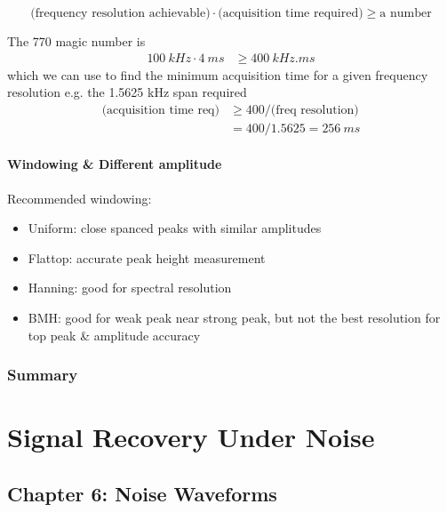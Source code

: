 \documentclass[../main.tex]{subfiles}
\begin{document}
\[\textrm{(frequency resolution achievable)} \cdot \textrm{(acquisition time required)} \geq  \textrm{a number}\]

The 770 magic number is
\begin{align*}
    \qty{100}{kHz} \cdot \qty{4}{ms} &\geq \qty{400}{kHz.ms}
\end{align*}
which we can use to find the minimum acquisition time for a given frequency resolution e.g. the 1.5625 kHz span required
\begin{align*}
    \textrm{(acquisition time req)} &\geq 400 / \textrm{(freq resolution)} \\
    &= 400 / 1.5625 = \qty{256}{ms}
\end{align*}

\paragraph*{Windowing \& Different amplitude}

Recommended windowing:
\begin{itemize}
    \item Uniform: close spanced peaks with similar amplitudes
    \item Flattop: accurate peak height measurement
    \item Hanning: good for spectral resolution
    \item BMH: good for weak peak near strong peak, but not the best resolution for top peak \& amplitude accuracy
\end{itemize}

\subsubsection*{Summary} 
\newpage
{}
\section{Signal Recovery Under Noise}

\subsection*{Chapter 6: Noise Waveforms}
\end{document}
